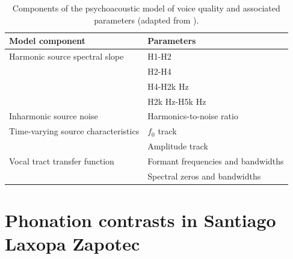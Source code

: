 \documentclass[12pt, letterpaper]{article}
\providecommand{\lsptoprule}{\midrule\toprule}
\providecommand{\lspbottomrule}{\bottomrule\midrule}
\begin{document}
\begin{table}[!h]
    \centering
    \caption{Components of the psychoacoustic model of voice quality and associated parameters (adapted from \cite{kreimanUnifiedTheoryVoice2014,garellekPhoneticsVoice2019}).}
    \label{tab:Kreiman}
    \begin{tabular}{ll}
    \lsptoprule
    Model component & Parameters \\
    \hline
    Harmonic source spectral slope      & H1-H2 \\
                                        & H2-H4 \\
	                                & H4-H2k Hz \\
	                                & H2k Hz-H5k Hz \\
    Inharmonic source noise             & Harmonics-to-noise ratio \\
    Time-varying source characteristics & $f_0$ track \\
	                                & Amplitude track \\
    Vocal tract transfer function       & Formant frequencies and bandwidths \\
	                                & Spectral zeros and bandwidths\\
    \lspbottomrule
    \end{tabular}
\end{table}



\section{Phonation contrasts in Santiago Laxopa Zapotec} \label{sec:SLZ}
\end{document}
